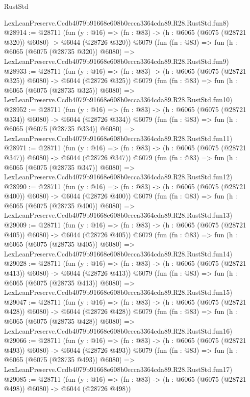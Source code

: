 \begin{lexlean}{RustStd}
\begin{coremodule}
    LexLeanPreserve.Ccdb4079b91668e608b0ecca3364cda89.R28.RustStd.fun8)
@28914 := @28711
    (fun (y : @16) => (fn : @83) -> (h : @6065 (@6075 (@28721 @320)) @6080) -> @6044 (@28726 @320))
    @6079
    (fun (fn : @83) =>
    fun (h : @6065 (@6075 (@28735 @320)) @6080) =>
    LexLeanPreserve.Ccdb4079b91668e608b0ecca3364cda89.R28.RustStd.fun9)
@28933 := @28711
    (fun (y : @16) => (fn : @83) -> (h : @6065 (@6075 (@28721 @325)) @6080) -> @6044 (@28726 @325))
    @6079
    (fun (fn : @83) =>
    fun (h : @6065 (@6075 (@28735 @325)) @6080) =>
    LexLeanPreserve.Ccdb4079b91668e608b0ecca3364cda89.R28.RustStd.fun10)
@28952 := @28711
    (fun (y : @16) => (fn : @83) -> (h : @6065 (@6075 (@28721 @334)) @6080) -> @6044 (@28726 @334))
    @6079
    (fun (fn : @83) =>
    fun (h : @6065 (@6075 (@28735 @334)) @6080) =>
    LexLeanPreserve.Ccdb4079b91668e608b0ecca3364cda89.R28.RustStd.fun11)
@28971 := @28711
    (fun (y : @16) => (fn : @83) -> (h : @6065 (@6075 (@28721 @347)) @6080) -> @6044 (@28726 @347))
    @6079
    (fun (fn : @83) =>
    fun (h : @6065 (@6075 (@28735 @347)) @6080) =>
    LexLeanPreserve.Ccdb4079b91668e608b0ecca3364cda89.R28.RustStd.fun12)
@28990 := @28711
    (fun (y : @16) => (fn : @83) -> (h : @6065 (@6075 (@28721 @400)) @6080) -> @6044 (@28726 @400))
    @6079
    (fun (fn : @83) =>
    fun (h : @6065 (@6075 (@28735 @400)) @6080) =>
    LexLeanPreserve.Ccdb4079b91668e608b0ecca3364cda89.R28.RustStd.fun13)
@29009 := @28711
    (fun (y : @16) => (fn : @83) -> (h : @6065 (@6075 (@28721 @405)) @6080) -> @6044 (@28726 @405))
    @6079
    (fun (fn : @83) =>
    fun (h : @6065 (@6075 (@28735 @405)) @6080) =>
    LexLeanPreserve.Ccdb4079b91668e608b0ecca3364cda89.R28.RustStd.fun14)
@29028 := @28711
    (fun (y : @16) => (fn : @83) -> (h : @6065 (@6075 (@28721 @413)) @6080) -> @6044 (@28726 @413))
    @6079
    (fun (fn : @83) =>
    fun (h : @6065 (@6075 (@28735 @413)) @6080) =>
    LexLeanPreserve.Ccdb4079b91668e608b0ecca3364cda89.R28.RustStd.fun15)
@29047 := @28711
    (fun (y : @16) => (fn : @83) -> (h : @6065 (@6075 (@28721 @428)) @6080) -> @6044 (@28726 @428))
    @6079
    (fun (fn : @83) =>
    fun (h : @6065 (@6075 (@28735 @428)) @6080) =>
    LexLeanPreserve.Ccdb4079b91668e608b0ecca3364cda89.R28.RustStd.fun16)
@29066 := @28711
    (fun (y : @16) => (fn : @83) -> (h : @6065 (@6075 (@28721 @493)) @6080) -> @6044 (@28726 @493))
    @6079
    (fun (fn : @83) =>
    fun (h : @6065 (@6075 (@28735 @493)) @6080) =>
    LexLeanPreserve.Ccdb4079b91668e608b0ecca3364cda89.R28.RustStd.fun17)
@29085 := @28711
    (fun (y : @16) => (fn : @83) -> (h : @6065 (@6075 (@28721 @498)) @6080) -> @6044 (@28726 @498))

\end{coremodule}
\end{lexlean}
